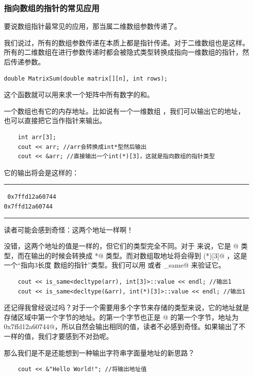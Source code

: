\subsubsection*{指向数组的指针的常见应用}
要说数组指针最常见的应用，那当属二维数组参数传递了。\par
我们说过，所有的数组参数传递在本质上都是指针传递。对于二维数组也是这样。所有的二维数组在进行参数传递时都会被隐式类型转换成指向一维数组的指针，然后传递参数。
\begin{lstlisting}
double MatrixSum(double matrix[][n], int rows);
\end{lstlisting}
这个函数就可以用来求一个矩阵中所有数字的和。\par
一个数组也有它的内存地址。比如说有一个一维数组 \lstinline@arr@，我们可以输出它的地址，也可以直接把它当作指针来输出。
\begin{lstlisting}
    int arr[3];
    cout << arr; //arr会转换成int*型然后输出
    cout << &arr; //直接输出一个int(*)[3]，这就是指向数组的指针类型
\end{lstlisting}
它的输出将会是这样的：\\\noindent\rule{\linewidth}{.2pt}\texttt{
0x7ffd12a60744\\
0x7ffd12a60744
}\\\noindent\rule{\linewidth}{.2pt}\par
读者可能会感到奇怪：这两个地址一样啊！\par
没错，这两个地址的值是一样的，但它们的类型完全不同。对于 \lstinline@arr@ 来说，它是 \lstinline@int[3]@ 类型，而在输出的时候会转换成 \lstinline@int*@ 类型。而对数组取地址将会得到 \lstinline@int(*)[3]@ ，这是一个``指向3长度 \lstinline@int@ 数组的指针''类型。我们可以用 \lstinline@typeid@ 或者 \lstinline@is_same@ 来验证它。
\begin{lstlisting}
    cout << is_same<decltype(arr), int[3]>::value << endl; //输出1
    cout << is_same<decltype(&arr), int(*)[3]>::value << endl; //输出1
\end{lstlisting}\par
还记得我曾经说过吗？对于一个需要用多个字节来存储的类型来说，它的地址就是存储区域中第一个字节的地址。\lstinline@arr@ 的第一个字节也正是 \lstinline@arr[0]@ 的第一个字节，地址为 \lstinline@0x7ffd12a60744@，所以自然会输出相同的值，读者不必感到奇怪。如果输出了不一样的值，我们才要感到不对劲呢。\par
那么我们是不是还能想到一种输出字符串字面量地址的新思路？
\begin{lstlisting}
    cout << &"Hello World!"; //将输出地址值
\end{lstlisting}
